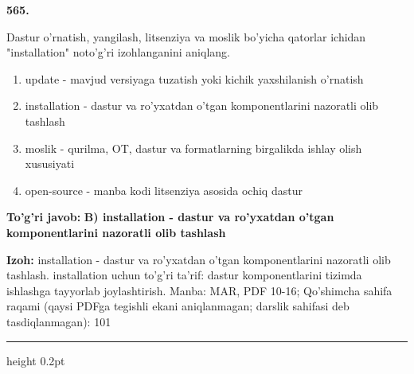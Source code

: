 \documentclass[10pt,a4paper]{article}
\begin{document}
{\bfseries\sffamily\color{ink} 565.}
\par
Dastur o'rnatish, yangilash, litsenziya va moslik bo'yicha qatorlar ichidan "installation" noto'g'ri izohlanganini aniqlang.
\begin{enumerate}[label=\Alph*),leftmargin=9mm]
\item update - mavjud versiyaga tuzatish yoki kichik yaxshilanish o'rnatish
\item installation - dastur va ro'yxatdan o'tgan komponentlarini nazoratli olib tashlash
\item moslik - qurilma, OT, dastur va formatlarning birgalikda ishlay olish xususiyati
\item open-source - manba kodi litsenziya asosida ochiq dastur
\end{enumerate}
\begin{tcolorbox}[enhanced,breakable,colback=teal!4,colframe=teal!60!black,boxrule=0.45pt,arc=1.2mm,left=2.7mm,right=2.7mm,top=1.8mm,bottom=1.8mm,before skip=2mm,after skip=2mm]
{\bfseries\sffamily\color{teal}To'g'ri javob:} \textbf{B) installation - dastur va ro'yxatdan o'tgan komponentlarini nazoratli olib tashlash}
\par\smallskip
{\bfseries Izoh:} installation - dastur va ro'yxatdan o'tgan komponentlarini nazoratli olib tashlash. installation uchun to'g'ri ta'rif: dastur komponentlarini tizimda ishlashga tayyorlab joylashtirish. Manba: MAR, PDF 10-16; Qo'shimcha sahifa raqami (qaysi PDFga tegishli ekani aniqlanmagan; darslik sahifasi deb tasdiqlanmagan): 101
\end{tcolorbox}
\vspace{2mm}\hrule height 0.2pt\vspace{3mm}
\end{document}
